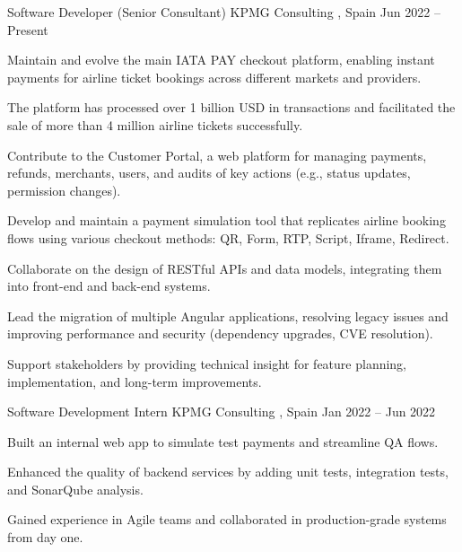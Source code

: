 

\begin{cventries}

  \cventry
    {Software Developer (Senior Consultant)} %
    {KPMG Consulting} %
    {\comMadrid, Spain} %
    {Jun 2022 – Present} %
    {
      \begin{cvitems} %
        \item {Maintain and evolve the main IATA PAY checkout platform, enabling instant payments for airline ticket bookings across different markets and providers.}
        \item {The platform has processed over 1 billion USD in transactions and facilitated the sale of more than 4 million airline tickets successfully.}
        \item {Contribute to the Customer Portal, a web platform for managing payments, refunds, merchants, users, and audits of key actions (e.g., status updates, permission changes).}
        \item {Develop and maintain a payment simulation tool that replicates airline booking flows using various checkout methods: QR, Form, RTP, Script, Iframe, Redirect.}
        \item {Collaborate on the design of RESTful APIs and data models, integrating them into front-end and back-end systems.}
        \item {Lead the migration of multiple Angular applications, resolving legacy issues and improving performance and security (dependency upgrades, CVE resolution).}
        \item {Support stakeholders by providing technical insight for feature planning, implementation, and long-term improvements.}
      \end{cvitems}
    }

  \cventry
    {Software Development Intern} %
    {KPMG Consulting} %
    {\comMadrid, Spain} %
    {Jan 2022 – Jun 2022} %
    {
      \begin{cvitems} %
        \item {Built an internal web app to simulate test payments and streamline QA flows.}
        \item {Enhanced the quality of backend services by adding unit tests, integration tests, and SonarQube analysis.}
        \item {Gained experience in Agile teams and collaborated in production-grade systems from day one.}
      \end{cvitems}
    }

\end{cventries}
